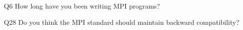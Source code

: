 \begin{description}%
\item{Q6} How long have you been writing MPI programs?%
\item{Q28} Do you think the MPI standard should maintain backward compatibility?%
\end{description}%
